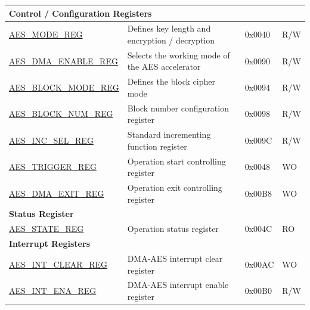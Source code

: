 \begin{longtable}{ | l | l | l | l | }
\multicolumn{4}{|l|}{\textbf{Control / Configuration Registers}} \\ \hline

\hyperref[regdesc:AESMODEREG]{AES\_MODE\_REG}				            &	Defines key length and encryption / decryption			    & 0x0040 & R/W \\ \hline
\hyperref[regdesc:AESDMAENABLEREG]{AES\_DMA\_ENABLE\_REG}		        &	Selects the working mode of the AES accelerator					                & 0x0090 & R/W \\ \hline
\hyperref[regdesc:AESBLOCKMODEREG]{AES\_BLOCK\_MODE\_REG}		        &	Defines the block cipher mode			        & 0x0094 & R/W \\ \hline
\hyperref[regdesc:AESBLOCKNUMREG]{AES\_BLOCK\_NUM\_REG}		   	        &	Block number configuration register			        & 0x0098 & R/W \\ \hline
\hyperref[regdesc:AESINCSELREG]{AES\_INC\_SEL\_REG}			            &	Standard incrementing function register               & 0x009C & R/W \\ \hline
\hyperref[regdesc:AESTRIGGERREG]{AES\_TRIGGER\_REG}			&	Operation start controlling register		& 0x0048 & WO \\ \hline
\hyperref[regdesc:AESDMAEXITREG]{AES\_DMA\_EXIT\_REG}		&	Operation exit controlling register	& 0x00B8 & WO \\ \hline

\multicolumn{4}{|l|}{\textbf{Status Register}} \\ \hline
\hyperref[regdesc:AESSTATEREG]{AES\_STATE\_REG}				&	Operation status register			& 0x004C & RO \\ \hline
\multicolumn{4}{|l|}{\textbf{Interrupt Registers}} \\ \hline

\hyperref[regdesc:AESINTCLEARREG]{AES\_INT\_CLEAR\_REG}			&	DMA-AES interrupt clear register	& 0x00AC & WO \\ \hline
\hyperref[regdesc:AESINTENAREG]{AES\_INT\_ENA\_REG}			&	DMA-AES interrupt enable register	& 0x00B0 & R/W \\ \hline

\end{longtable}
